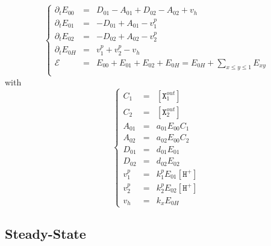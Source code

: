 \documentclass[aps,onecolumn,12pt]{revtex4}
\newcommand{\mychem}[1]{\mathtt{#1}}
\newcommand{\myconc}[1]{\left[#1\right]}
\newcommand{\spx}{\mychem{X}}
\newcommand{\spproton}{\mychem{H^+}}
\newcommand{\proton}{\myconc{\spproton}}
\begin{document}
\begin{equation}
\left\lbrace
\begin{array}{rcl}
\partial_t E_{00} & = & D_{01}-A_{01} + D_{02}-A_{02} + v_h\\
\partial_t E_{01} & = & -D_{01}+A_{01} -v^p_1 \\
\partial_t E_{02} & = & -D_{02}+A_{02} -v^p_2\\
\partial_t E_{0H} & = & v^p_1 + v^p_2 - v_h\\
\mathcal{E}       & = & E_{00}+E_{01}+E_{02} + E_{0H} = E_{0H} + {\displaystyle \sum_{x\leq y\leq 1} E_{xy}}\\
\end{array}
\right.
\end{equation}
with
\begin{equation}
\left\lbrace
\begin{array}{rcl}
C_1    & = & \myconc{\spx_1^{out}}\\
C_2    & = & \myconc{\spx_2^{out}}\\
A_{01} &= &a_{01} E_{00} C_1\\
A_{02} &= &a_{02} E_{00} C_2\\
D_{01} &= &d_{01} E_{01}\\
D_{02} &= &d_{02} E_{02}\\
v^p_1  &=& k^p_1 E_{01} \proton\\
v^p_2  &=& k^p_2 E_{02} \proton\\
v_h    &=& k_x  E_{0H}
\end{array}
\right.
\end{equation}

\subsection{Steady-State}
\end{document}
